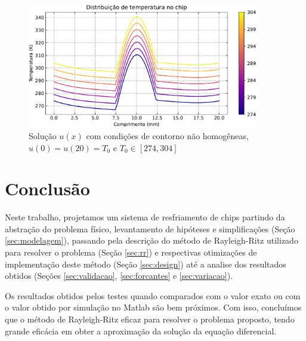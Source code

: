 \documentclass[a4,12pt]{horizon-theme}
\begin{document}
\begin{figure}[!ht]
  \centering
  \includegraphics[width=0.9\textwidth]{../plots/test_8.pdf}
  \caption{Solução $u(x)$ com condições de contorno não homogêneas, $u(0) = u(20) = T_0$ e $T_0 \in [274, 304]$}
  \label{fig:t8}
\end{figure}


\newpage
\section{Conclusão}
Neste trabalho, projetamos um sistema de resfriamento de chips partindo da abstração do problema físico, levantamento de hipóteses e simplificações (Seção \ref{sec:modelagem}), passando pela descrição do método de Rayleigh-Ritz utilizado para resolver o problema (Seção \ref{sec:rr}) e respectivas otimizações de implementação deste método (Seção \ref{sec:design}) até a analise dos resultados obtidos (Seções \ref{sec:validacao}, \ref{sec:forcantes} e \ref{sec:variacao}).

Os resultados obtidos pelos testes quando comparados com o valor exato ou com o valor obtido por simulação no Matlab são bem próximos. Com isso, concluímos que o método de Rayleigh-Ritz eficaz para resolver o problema proposto, tendo grande eficácia em obter a aproximação da solução da equação diferencial.







\horizonBackCover
\end{document}
